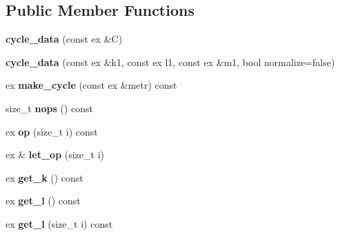 \subsection*{Public Member Functions}
\begin{DoxyCompactItemize}
\item 
\mbox{\label{class_moeb_inv_1_1cycle__data_a663f4881bd39482833c3a286f042180b}} 
{\bfseries cycle\+\_\+data} (const ex \&C)
\item 
\mbox{\label{class_moeb_inv_1_1cycle__data_a3cf7bb544796c23210fa9f1295cd5056}} 
{\bfseries cycle\+\_\+data} (const ex \&k1, const ex l1, const ex \&m1, bool normalize=false)
\item 
\mbox{\label{class_moeb_inv_1_1cycle__data_a5a5247e7df39d6562828a0ea15ecaa24}} 
ex {\bfseries make\+\_\+cycle} (const ex \&metr) const
\item 
\mbox{\label{class_moeb_inv_1_1cycle__data_aa051c6565f1d04ad8567878c43aa206a}} 
size\+\_\+t {\bfseries nops} () const
\item 
\mbox{\label{class_moeb_inv_1_1cycle__data_a83456262104d3cdc43d1b7a41bd3bf67}} 
ex {\bfseries op} (size\+\_\+t i) const
\item 
\mbox{\label{class_moeb_inv_1_1cycle__data_a7b3324e58cfd67f6d5a0dfca61b27958}} 
ex \& {\bfseries let\+\_\+op} (size\+\_\+t i)
\item 
\mbox{\label{class_moeb_inv_1_1cycle__data_a4972f8fb7fb211878540c3159ad11905}} 
ex {\bfseries get\+\_\+k} () const
\item 
\mbox{\label{class_moeb_inv_1_1cycle__data_a67fecf1fb0409c22460c8611f41c335a}} 
ex {\bfseries get\+\_\+l} () const
\item 
\mbox{\label{class_moeb_inv_1_1cycle__data_a936576cdde90230b7ae62c044c8ff0cd}} 
ex {\bfseries get\+\_\+l} (size\+\_\+t i) const
\item 
\mbox{\label{class_moeb_inv_1_1cycle__data_a40d7c531c8db470cea3561d366ce0f6d}} 

\end{DoxyCompactItemize}
